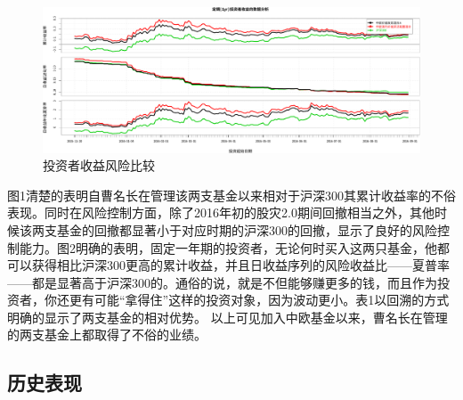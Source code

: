 \documentclass[hyperref,]{ctexart}
\begin{document}
\begin{figure}[htbp]
\centering
\includegraphics{caominchang-details_files/figure-latex/unnamed-chunk-2-1.pdf}
\caption{投资者收益风险比较}
\end{figure}

图1清楚的表明自曹名长在管理该两支基金以来相对于沪深300其累计收益率的不俗表现。同时在风险控制方面，除了2016年初的股灾2.0期间回撤相当之外，其他时候该两支基金的回撤都显著小于对应时期的沪深300的回撤，显示了良好的风险控制能力。图2明确的表明，固定一年期的投资者，无论何时买入这两只基金，他都可以获得相比沪深300更高的累计收益，并且日收益序列的风险收益比------夏普率------都是显著高于沪深300的。通俗的说，就是不但能够赚更多的钱，而且作为投资者，你还更有可能``拿得住''这样的投资对象，因为波动更小。表1以回溯的方式明确的显示了两支基金的相对优势。
以上可见加入中欧基金以来，曹名长在管理的两支基金上都取得了不俗的业绩。

\subsection{历史表现}
\end{document}
